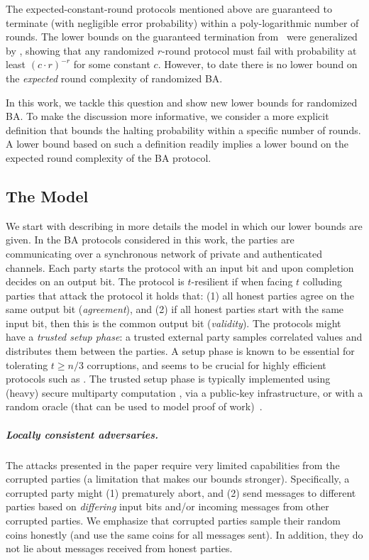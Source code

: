 The expected-constant-round protocols mentioned above are guaranteed to terminate (with negligible error probability) within a poly-logarithmic number of rounds.
The lower bounds on the guaranteed termination from~\cite{FL82,DS83} were generalized by \cite{CMS89,KY86}, showing that any randomized $r$-round protocol must fail with probability at least $(c\cdot r)^{-r}$ for some constant $c$. However, to date there is no lower bound on the \emph{expected} round complexity of randomized BA.

In this work, we tackle this question and show new lower bounds for randomized BA. To make the discussion more informative, we consider a more explicit definition that bounds the halting probability within a specific number of rounds. A lower bound based on such a definition readily implies a lower bound on the expected round complexity of the BA protocol.

\subsection{The Model}\label{sec:intro:model}
We start with describing in more details the model in which our lower bounds are given. In the BA protocols considered in this work, the parties are communicating over a synchronous network of private and authenticated channels. Each party starts the protocol with an input bit and upon completion decides on an output bit. The protocol is $t$-resilient if when facing $t$ colluding parties that attack the protocol it holds that: (1) all honest parties agree on the same output bit (\emph{agreement}), and (2) if all honest parties start with the same input bit, then this is the common output bit (\emph{validity}). The protocols might have a \emph{trusted setup phase}: a trusted external party samples correlated values and distributes them between the parties. A setup phase is known to be essential for tolerating $t\geq n/3$ corruptions, and seems to be crucial for highly efficient protocols such as \cite{Micali17,SM16,MV17,ADDNR19,ACDNPRS19}. The trusted setup phase is typically implemented using (heavy) secure multiparty computation \cite{BCGTV15,BGG18}, via a public-key infrastructure, or with a random oracle (that can be used to model proof of work)~\cite{PS17}.

\subparagraph{Locally consistent adversaries.}
The attacks presented in the paper require very limited capabilities from the corrupted parties (a limitation that makes our bounds stronger). Specifically, a corrupted party might (1) prematurely abort, and (2) send messages to different parties based on \emph{differing} input bits and/or incoming messages from other corrupted parties. We emphasize that corrupted parties sample their random coins honestly (and use the same coins for all messages sent). In addition, they do not lie about messages received from honest parties.


